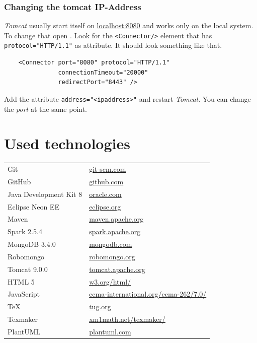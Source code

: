 \documentclass[10pt]{article}
\begin{document}
\subsubsection{Changing the tomcat IP-Address} \emph{Tomcat} usually start itself on \href{http://localhost:8080/}{localhost:8080} and works only on the local system. To change that open . Look for the \texttt{<Connector/>} element that has \texttt{protocol="HTTP/1.1"} as attribute. It should look something like that.
\begin{lstlisting}
    <Connector port="8080" protocol="HTTP/1.1"
               connectionTimeout="20000"
               redirectPort="8443" />
\end{lstlisting}
Add the attribute \texttt{address="<ipaddress>"} and restart \emph{Tomcat}. You can change the \emph{port} at the same point.
\section{Used technologies}
\begin{tabular}{l l}
Git & \href{https://www.git-scm.com/}{git-scm.com}\\
GitHub & \href{https://www.github.com/}{github.com}\\
Java Development Kit 8 & \href{https://www.oracle.com/index.html}{oracle.com}\\
Eclipse Neon EE & \href{https://www.eclipse.org/}{eclipse.org}\\
Maven & \href{https://maven.apache.org/}{maven.apache.org}\\
Spark 2.5.4 & \href{https://spark.apache.org/}{spark.apache.org}\\
MongoDB 3.4.0 & \href{https://www.mongodb.com/}{mongodb.com}\\
Robomongo & \href{https://www.robomongo.org/}{robomongo.org}\\
Tomcat 9.0.0 & \href{https://tomcat.apache.org/}{tomcat.apache.org}\\
HTML 5 & \href{https://www.w3.org/html/}{w3.org/html/}\\
JavaScript & \href{http://www.ecma-international.org/ecma-262/7.0/index.html}{ecma-international.org/ecma-262/7.0/}\\
TeX & \href{https://www.tug.org/}{tug.org}\\
Texmaker & \href{http://www.xm1math.net/texmaker/}{xm1math.net/texmaker/}\\
PlantUML & \href{http://www.plantuml.com/}{plantuml.com}\\
\end{tabular}
\end{document}
